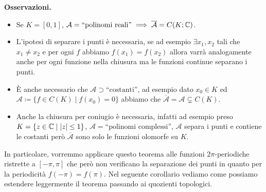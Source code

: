 \textbf{Osservazioni.}
\begin{itemize}
	\item Se $K = [0, 1]$, $\mathcal A = \text{``polinomi reali''} \implies \overline{\mathcal A} = C(K; \mathbb C)$.
	
	\item L'ipotesi di separare i punti è necessaria, se ad esempio $\exists x_1, x_2$ tali che $x_1 \neq x_2$ e per ogni $f$ abbiamo $f(x_1) = f(x_2)$ allora varrà analogamente anche per ogni funzione nella chiusura ma le funzioni continue separano i punti.

	\item È anche necessario che $\mathcal A \supset \text{``costanti''}$, ad esempio dato $x_0 \in K$ ed $\mathcal A \coloneqq \{ f \in C(K) \mid f(x_0) = 0 \}$ abbiamo che $\overline{\mathcal A} = \mathcal A \subsetneq C(K)$.

	\item Anche la chiusura per coniugio è necessaria, infatti ad esempio preso $K = \{ z \in \mathbb C \mid |z| \leq 1 \}$, $\mathcal A = \text{``polinomi complessi''}$, $\mathcal A$ separa i punti e contiene le costanti però $\overline{\mathcal A}$ sono solo le funzioni olomorfe su $K$.
\end{itemize}

In particolare, vorremmo applicare questo teorema alle funzioni $2\pi$-periodiche ristrette a $[-\pi, \pi]$ che però non verificano la separazione dei punti in quanto per la periodicità $f(-\pi) = f(\pi)$. Nel seguente corollario vediamo come possiamo estendere leggermente il teorema passando ai quozienti topologici.

